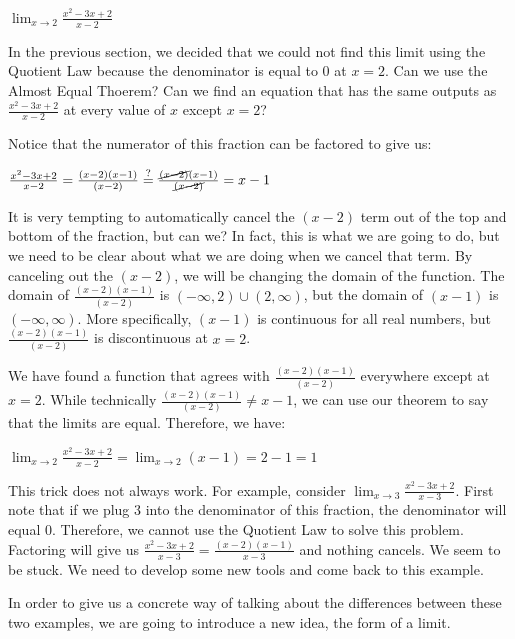 \documentclass{ximera}
\begin{document}
\begin{example}
$\lim_{x\to 2}\frac{x^2-3x+2}{x-2}$
\begin{solution}
In the previous section, we decided that we could not find this limit using the Quotient Law because the denominator is equal to 0 at $x=2$.  Can we use the Almost Equal Thoerem? Can we find an equation that has the same outputs as $\frac{x^2-3x+2}{x-2}$ at every value of $x$ except $x=2$?  

Notice that the numerator of this fraction can be factored to give us:

 $\frac{x^2-3x+2}{x-2} =  \frac{(x-2)(x-1)}{(x-2)} \stackrel{?}{=}\frac{\cancel{(x-2)}(x-1)}{\cancel{(x-2)}}=x-1$
 
 It is very tempting to automatically cancel the $(x-2)$ term out of the top and bottom of the fraction, but can we?  In fact, this is what we are going to do, but we need to be clear about what we are doing when we cancel that term.  By canceling out the $(x-2)$, we will be changing the domain of the function.  The domain of $\frac{(x-2)(x-1)}{(x-2)}$ is $(-\infty,2)\cup(2,\infty)$, but the domain of $(x-1)$ is $(-\infty,\infty)$.  More specifically, $(x-1)$ is continuous for all real numbers, but  $\frac{(x-2)(x-1)}{(x-2)}$ is discontinuous at $x=2$.
 
 
We have found a function that agrees with $\frac{(x-2)(x-1)}{(x-2)}$ everywhere except at $x=2$.  While technically $\frac{(x-2)(x-1)}{(x-2)} \neq x-1$, we can use our theorem to say that the limits are equal.  Therefore, we have:
 
 $\lim_{x\to 2}\frac{x^2-3x+2}{x-2} = \lim_{x\to 2} (x-1) = 2-1 =1$
 
 \end{solution}
\end{example} 

This trick does not always work.  For example, consider $\lim_{x\to 3}\frac{x^2-3x+2}{x-3}$. First note that if we plug $3$ into the denominator of this fraction, the denominator will equal $0$.  Therefore, we cannot use the Quotient Law to solve this problem.  Factoring will give us $\frac{x^2-3x+2}{x-3}=\frac{(x-2)(x-1)}{x-3}$ and nothing cancels.  We seem to be stuck.  We need to develop some new tools and come back to this example.

In order to give us a concrete way of talking about the differences between these two examples, we are going to introduce a new idea, the form of a limit.
\end{document}
